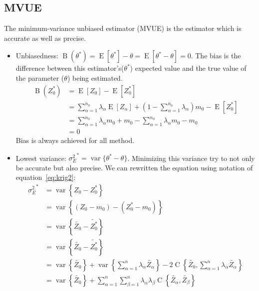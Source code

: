 \documentclass[twocolumn]{article}
\numberwithin{equation}{section}
\begin{document}
\subsection{MVUE}
The minimum-variance unbiased estimator (MVUE) is the estimator which is accurate as well as precise.
\begin{itemize}
	\item Unbiasedness: $\operatorname{B}( \theta^*) = \operatorname{E}[\theta^*]-\theta= \operatorname{E}[\theta^*-\theta]=0$. The bias is the difference between this estimator's($\theta^*$) expected value and the true value of the parameter ($\theta$) being estimated. 
	\begin{align*}
		\operatorname{B}(Z^*_0)	&= \operatorname{E}[Z_0] - \operatorname{E}[Z^*_0]\\
		  						&= \sum_{\alpha=1}^{n_0} \lambda_\alpha \operatorname{E}\left[Z_\alpha \right] + \left( 1- \sum_{\alpha=1}^{n_0} \lambda_\alpha\right) m_0 - \operatorname{E}[Z^*_0]\\
		 						&= \sum_{\alpha=1}^{n_0} \lambda_\alpha m_0 +m_0 - \sum_{\alpha=1}^{n_0} \lambda_\alpha m_0  -m_0\\
		 						&= 0
	\end{align*}
	Bias is always achieved for all method.
	\item Lowest variance: ${\sigma^2_E}^*=\operatorname{var}\{\theta^*-\theta\}$. Minimizing this variance try to not only be accurate but also precise. We can rewritten the equation using notation of equation~\ref{eq:krig2}:
	\begin{align} \label{eq:variance}
		{\sigma^2_E}^* 	&= \operatorname{var} \left\{ Z_0-Z^*_0 \right\} \nonumber\\
						&= \operatorname{var} \left\{ (Z_0-m_0) - (Z^*_0-m_0) \right\} \nonumber\\
						&= \operatorname{var} \left\{ \tilde{Z_0}-\tilde{Z^*_0} \right\} \nonumber \\
						&= \operatorname{var} \left\{ \tilde{Z_0}-\tilde{Z^*_0} \right\} \nonumber \\
						&= \operatorname{var}\left\{\tilde{Z_0}\right\}  +  \operatorname{var}\left\{\sum_{\alpha=1}^n \lambda_\alpha \tilde{Z_\alpha}\right\} -  2 \operatorname{C}\left\{\tilde{Z_0},\sum_{\alpha=1}^n \lambda_\alpha \tilde{Z_\alpha}\right\} \nonumber\\
						&= \operatorname{var}\left\{\tilde{Z_0}\right\}    + \sum_{\alpha=1}^n \sum_{\beta=1}^n \lambda_\alpha \lambda_\beta \operatorname{C}\left\{\tilde{Z_\alpha},\tilde{Z_\beta}\right\} \nonumber \\

\end{align}
\end{itemize}
\end{document}
